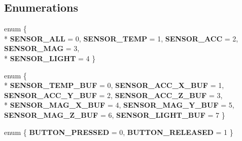 \subsection*{Enumerations}
\begin{DoxyCompactItemize}
\item 
\hypertarget{group___engduino_protocol_ga99fb83031ce9923c84392b4e92f956b5}{}enum \{ \\*
{\bfseries S\+E\+N\+S\+O\+R\+\_\+\+A\+L\+L} = 0, 
{\bfseries S\+E\+N\+S\+O\+R\+\_\+\+T\+E\+M\+P} = 1, 
{\bfseries S\+E\+N\+S\+O\+R\+\_\+\+A\+C\+C} = 2, 
{\bfseries S\+E\+N\+S\+O\+R\+\_\+\+M\+A\+G} = 3, 
\\*
{\bfseries S\+E\+N\+S\+O\+R\+\_\+\+L\+I\+G\+H\+T} = 4
 \}\label{group___engduino_protocol_ga99fb83031ce9923c84392b4e92f956b5}

\item 
\hypertarget{group___engduino_protocol_gabc6126af1d45847bc59afa0aa3216b04}{}enum \{ \\*
{\bfseries S\+E\+N\+S\+O\+R\+\_\+\+T\+E\+M\+P\+\_\+\+B\+U\+F} = 0, 
{\bfseries S\+E\+N\+S\+O\+R\+\_\+\+A\+C\+C\+\_\+\+X\+\_\+\+B\+U\+F} = 1, 
{\bfseries S\+E\+N\+S\+O\+R\+\_\+\+A\+C\+C\+\_\+\+Y\+\_\+\+B\+U\+F} = 2, 
{\bfseries S\+E\+N\+S\+O\+R\+\_\+\+A\+C\+C\+\_\+\+Z\+\_\+\+B\+U\+F} = 3, 
\\*
{\bfseries S\+E\+N\+S\+O\+R\+\_\+\+M\+A\+G\+\_\+\+X\+\_\+\+B\+U\+F} = 4, 
{\bfseries S\+E\+N\+S\+O\+R\+\_\+\+M\+A\+G\+\_\+\+Y\+\_\+\+B\+U\+F} = 5, 
{\bfseries S\+E\+N\+S\+O\+R\+\_\+\+M\+A\+G\+\_\+\+Z\+\_\+\+B\+U\+F} = 6, 
{\bfseries S\+E\+N\+S\+O\+R\+\_\+\+L\+I\+G\+H\+T\+\_\+\+B\+U\+F} = 7
 \}\label{group___engduino_protocol_gabc6126af1d45847bc59afa0aa3216b04}

\item 
\hypertarget{group___engduino_protocol_gadc29c2ff13d900c2f185ee95427fb06c}{}enum \{ {\bfseries B\+U\+T\+T\+O\+N\+\_\+\+P\+R\+E\+S\+S\+E\+D} = 0, 
{\bfseries B\+U\+T\+T\+O\+N\+\_\+\+R\+E\+L\+E\+A\+S\+E\+D} = 1
 \}\label{group___engduino_protocol_gadc29c2ff13d900c2f185ee95427fb06c}

\end{DoxyCompactItemize}
